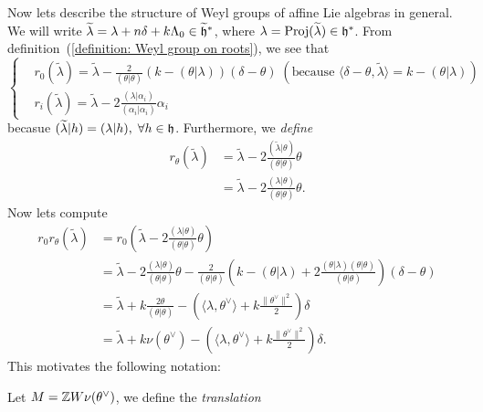 \begin{itemize}
Now lets describe the structure of Weyl groups of affine Lie algebras in general. We will write 
$\widetilde{\lambda}=\lambda + n\delta+k\Lambda_0\in\widetilde{\mathfrak{h}}^*$, where $\lambda=\text{Proj}(\widetilde{\lambda})\in\mathfrak{h}^*$. 
From definition~(\ref{definition: Weyl group on roots}), we see that 
\begin{equation}
   \left\{ \begin{aligned}
        &r_0(\widetilde{\lambda})=\widetilde{\lambda} -\frac{2}{(\theta|\theta)}(k-(\theta|\lambda))(\delta-\theta)
        \;(\text{because }\langle\delta-\theta,\widetilde{\lambda}\rangle= k-(\theta|\lambda))\\
        &r_i(\widetilde{\lambda})=\widetilde{\lambda} - 2\frac{(\lambda|\alpha_i)}{(\alpha_i|\alpha_i)}\alpha_i
    \end{aligned}\right.
\end{equation}
becasue $(\widetilde{\lambda}|h)=(\lambda|h),\;\forall h\in\mathfrak{h}$. Furthermore, we \textit{define}
\begin{equation}
    \begin{split}
        r_\theta(\widetilde{\lambda}) &= \widetilde{\lambda}-2\frac{(\widetilde{\lambda}|\theta)}{(\theta|\theta)}\theta\\
        &=\widetilde{\lambda}-2\frac{(\lambda|\theta)}{(\theta|\theta)}\theta.
    \end{split}
\end{equation}
Now lets compute 
\begin{equation}
    \begin{split}
        r_0 r_\theta(\widetilde{\lambda})&= r_0(\widetilde{\lambda}-2\frac{(\lambda|\theta)}{(\theta|\theta)}\theta)\\
        &=\widetilde{\lambda} - 2\frac{(\lambda|\theta)}{(\theta|\theta)}\theta-\frac{2}{(\theta|\theta)}
        (k-(\theta|\lambda)+2\frac{(\theta|\lambda)(\theta|\theta)}{(\theta|\theta)})(\delta-\theta)\\
        &=\widetilde{\lambda}+k\frac{2\theta}{(\theta|\theta)}-(\langle\lambda,\theta^\vee\rangle+k\frac{\|\theta^\vee\|^2}{2})\delta \\
        &=\widetilde{\lambda}+k\nu(\theta^\vee)-(\langle\lambda,\theta^\vee\rangle+k\frac{\|\theta^\vee\|^2}{2})\delta.
    \end{split}
\end{equation}
This motivates the following notation:
\begin{notation}
    Let $M=\mathbb{Z} W\nu(\theta^\vee)$, we define the \textit{translation}
    \begin{equation}

\end{equation}
\end{notation}
\end{itemize}
